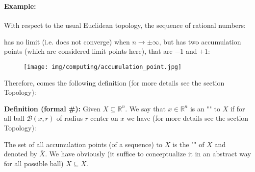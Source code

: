 	\begin{tcolorbox}[colframe=black,colback=white,sharp corners]
	\textbf{{\Large {}}Example:}\\\\
	With respect to the usual Euclidean topology, the sequence of rational numbers:
	
	has no limit (i.e. does not converge) when $n\rightarrow \pm \infty$, but has two accumulation points (which are considered limit points here), that are $-1$ and $+1$:
	\begin{figure}[H]
		\centering
		\texttt{[image: img/computing/accumulation\_point.jpg]}
	\end{figure}
	\end{tcolorbox}
	Therefore, comes the following definition (for more details see the section Topology):
	
	\textbf{Definition (formal \#\mydef):} Given $X \subseteq \mathbb{R}^n$. We say that $x\in \mathbb{R}^n$ is an "" to $X$ if for all ball $\mathcal{B}(x,r)$ of radius $r$ center on $x$ we have (for more details see the section Topology):
	
	The set of all accumulation points (of a sequence) to $X$ is the "" of $X$ and denoted by $\bar{X}$. We have obviously (it suffice to conceptualize it in an abstract way for all possible ball) $X \subseteq \bar{X}$.
	
